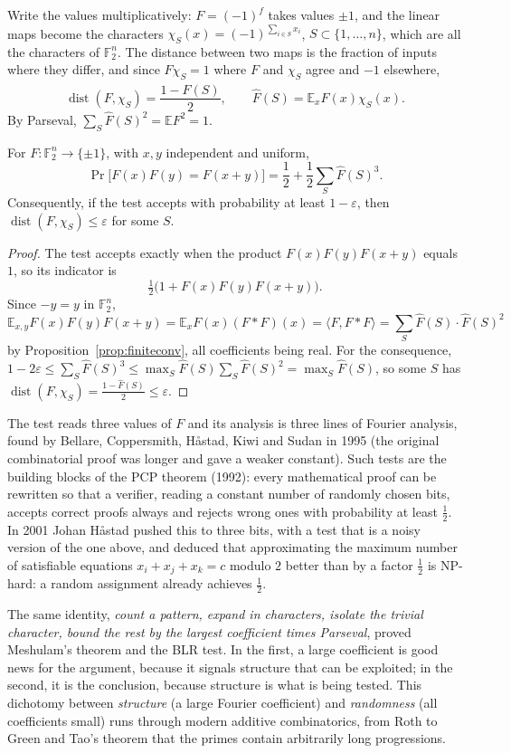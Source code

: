 Write the values multiplicatively: $F=(-1)^f$ takes values $\pm1$, and the linear maps become the characters
$\chi_S(x)=(-1)^{\sum_{i\in S}x_i}$, $S\subset\{1,\dots,n\}$, which are all the characters of $\mathbb F_2^n$. The distance between two maps is the fraction of
inputs where they differ, and since $F\chi_S=1$ where $F$ and $\chi_S$ agree and $-1$ elsewhere,
\[\operatorname{dist}(F,\chi_S)=\frac{1-\hat F(S)}2,\qquad\hat F(S)=\mathbb E_xF(x)\chi_S(x).\]
By Parseval, $\sum_S\hat F(S)^2=\mathbb E F^2=1$.

\begin{theorem}\label{thm:blr}
For $F:\mathbb F_2^n\to\{\pm1\}$, with $x,y$ independent and uniform,
\[\Pr\bigl[F(x)F(y)=F(x+y)\bigr]=\frac12+\frac12\sum_S\hat F(S)^3.\]
Consequently, if the test accepts with probability at least $1-\varepsilon$, then $\operatorname{dist}(F,\chi_S)\le\varepsilon$ for some $S$.
\end{theorem}
\begin{proof}
The test accepts exactly when the product $F(x)F(y)F(x+y)$ equals $1$, so its indicator is
\[\tfrac12\bigl(1+F(x)F(y)F(x+y)\bigr).\]
Since $-y=y$ in $\mathbb F_2^n$,
\[\mathbb E_{x,y}F(x)F(y)F(x+y)=\mathbb E_xF(x)(F*F)(x)=\langle F,F*F\rangle=\sum_S\hat F(S)\cdot\hat F(S)^2\]
by Proposition~\ref{prop:finiteconv}, all coefficients being real. For the consequence, $1-2\varepsilon\le\sum_S\hat F(S)^3\le\max_S\hat F(S)\sum_S\hat F(S)^2=\max_S\hat F(S)$, so
some $S$ has $\operatorname{dist}(F,\chi_S)=\frac{1-\hat F(S)}2\le\varepsilon$.
\end{proof}

The test reads three values of $F$ and its analysis is three lines of Fourier analysis, found by Bellare, Coppersmith, H\aa stad, Kiwi and Sudan
in 1995 (the original combinatorial proof was longer and gave a weaker constant). Such tests are the building blocks of the PCP theorem (1992):
every mathematical proof can be rewritten so that a verifier, reading a constant number of randomly chosen bits, accepts correct proofs
always and rejects wrong ones with probability at least $\frac12$. In 2001 Johan H\aa stad pushed this to three bits, with a test that is a
noisy version of the one above, and deduced that approximating the maximum number of satisfiable equations $x_i+x_j+x_k=c$ modulo $2$
better than by a factor $\frac12$ is NP-hard: a random assignment already achieves $\frac12$.

\begin{beauty}
The same identity, \emph{count a pattern, expand in characters, isolate the trivial character, bound the rest by the largest
coefficient times Parseval}, proved Meshulam's theorem and the BLR test. In the first, a large coefficient is good news for the
argument, because it signals structure that can be exploited; in the second, it is the conclusion, because structure is what is being
tested. This dichotomy between \emph{structure} (a large Fourier coefficient) and \emph{randomness} (all coefficients small) runs through
modern additive combinatorics, from Roth to Green and Tao's theorem that the primes contain arbitrarily long progressions.
\end{beauty}

